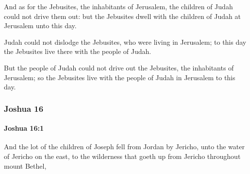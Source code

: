 			\begin{versebox}
					\item[BHS] 
					\item[ASV] And as for the Jebusites, the inhabitants of Jerusalem, the children of Judah could not drive them out: but the Jebusites dwell with the children of Judah at Jerusalem unto this day.
					\item[NIV] Judah could not dislodge the Jebusites, who were living in Jerusalem; to this day the Jebusites live there with the people of Judah.
					\item[NRSV] But the people of Judah could not drive out the Jebusites, the inhabitants of Jerusalem; so the Jebusites live with the people of Judah in Jerusalem to this day.
			\end{versebox}
	\subsubsection{Joshua 16} %
		\label{JOSHUA-16}

		\paragraph{Joshua 16:1} %
			\label{JOSHUA-16-1}

			And the lot of the children of Joseph fell from Jordan by Jericho, unto the water of Jericho on the east, to the wilderness that goeth up from Jericho throughout mount Bethel,

